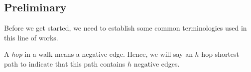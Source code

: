 \begin{center}
\end{center}

\subsection{Preliminary}

Before we get started, we need to establish some common terminologies used in this line of works.

\begin{notation}[Hop]\label{not:hop}
	A \emph{hop} in a walk means a negative edge. Hence, we will say an \(h\)-hop shortest path to indicate that this path contains \(h\) negative edges.
\end{notation}